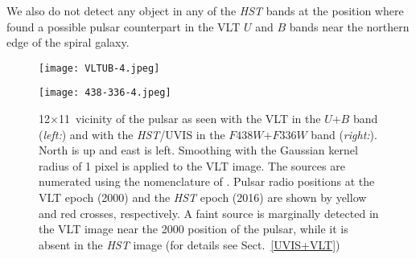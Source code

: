 \documentclass[pdftex,twocolumn]{aastex62}
\def\degs{\ifmmode ^{\circ}\else$^{\circ}$\fi}
\def\amin{\ifmmode ^{\prime}\else$^{\prime}$\fi}
\def\h{$^{\rm h}$}
\def\m{$^{\rm m}$}
\newcommand{\gp}[1]{{\color{blue} #1}}
\begin{document}
We also do not detect any object in any of the {\sl HST} bands  at the
position where \citet{Mignani2008} found a possible pulsar counterpart in the VLT $U$ and $B$  bands near the northern edge of the spiral galaxy. 
\begin{figure*}[t]
\begin{minipage}[h]{0.5\linewidth}
\texttt{[image: VLTUB-4.jpeg]}
\end{minipage}
\begin{minipage}[h]{0.5\linewidth}
\texttt{[image: 438-336-4.jpeg]}
\end{minipage}
\caption{
12$\times$11\ vicinity of the pulsar as seen with the VLT in the $U$$+$$B$ band ({\sl left:}) and  with the {\sl HST}/UVIS in the $F438W$$+$$F336W$ band 
({\sl right:}). North is up and east is left. Smoothing with the Gaussian kernel %
radius of 1 pixel is applied to the VLT image.  The sources are numerated using the nomenclature of \citet{Mignani2003}.   
Pulsar radio positions at the VLT epoch (2000) and the {\sl HST}  epoch (2016) are shown by  yellow and red crosses, respectively. %
A faint source  is marginally detected in the VLT image near the 2000 position of the pulsar, while it is absent in the {\sl HST} image (for details see Sect.~\ref{UVIS+VLT})  
\label{fig:6}}
\end{figure*}
\end{document}
